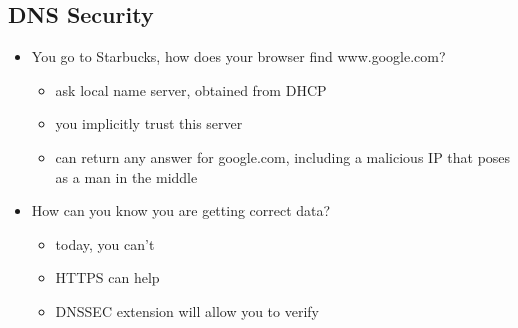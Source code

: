 \subsection{DNS Security}
\begin{itemize}[nosep]
    \item You go to Starbucks,  how does your browser find www.google.com?
          \begin{itemize}[nosep]
              \item ask local name server, obtained from DHCP
              \item you implicitly trust this server
              \item can return any answer for google.com, including a malicious IP that poses as a man in the middle
          \end{itemize}
    \item How can you know you are getting correct data?
          \begin{itemize}[nosep]
              \item today, you can't
              \item HTTPS can help
              \item DNSSEC extension will allow you to verify
          \end{itemize}
\end{itemize}
